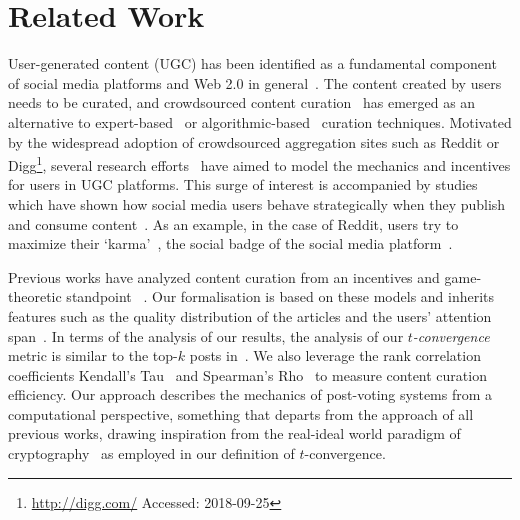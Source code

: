 \section{Related Work}
User-generated content (UGC) has been identified as a fundamental component of social media platforms and Web 2.0 in general~\cite{kaplan2010users}. The content created by users needs to be curated, and crowdsourced content curation~\cite{askalidis2013theoretical} has emerged as an alternative to expert-based~\cite{stanoevska2012content} or algorithmic-based~\cite{rader2015understanding} curation techniques. Motivated by the widespread adoption of crowdsourced aggregation sites such as Reddit or Digg\footnote{\url{http://digg.com/} Accessed: 2018-09-25}, several research efforts~\cite{das2010ranking,ghosh2011incentivizing,abbassi2014distributed} have aimed to model the mechanics and incentives for users in UGC platforms. This surge of interest is accompanied by studies which have shown how
social media users behave strategically when they publish and consume content~\cite{may2014filter}. As an example, in the case of Reddit, users try to maximize their `karma'~\cite{bergstrom2011don}, the social badge of the social media platform~\cite{anderson2013steering}.

Previous works have analyzed content curation from an incentives and game-theoretic standpoint~\cite{ghosh2011incentivizing,das2010ranking,gupte2009news,may2014filter,abbassi2014distributed} . Our formalisation is based on these models and inherits features such as the quality distribution of the articles and the users' attention span~\cite{askalidis2013theoretical,ghosh2011incentivizing}. In terms of the analysis of our results, the analysis of our \textit{$t$-convergence} metric is similar to the top-$k$ posts in~\cite{askalidis2013theoretical}. We also leverage the rank correlation coefficients Kendall's Tau~\cite{kendall1955rank} and Spearman's Rho~\cite{spearman1904proof} to measure content curation efficiency.
Our approach describes the mechanics of post-voting systems from a computational perspective, something that departs from the approach of all previous works, drawing inspiration from the real-ideal world paradigm of cryptography~\cite{goldreich1999foundations,lindell} as employed in our definition of $t$-convergence.

